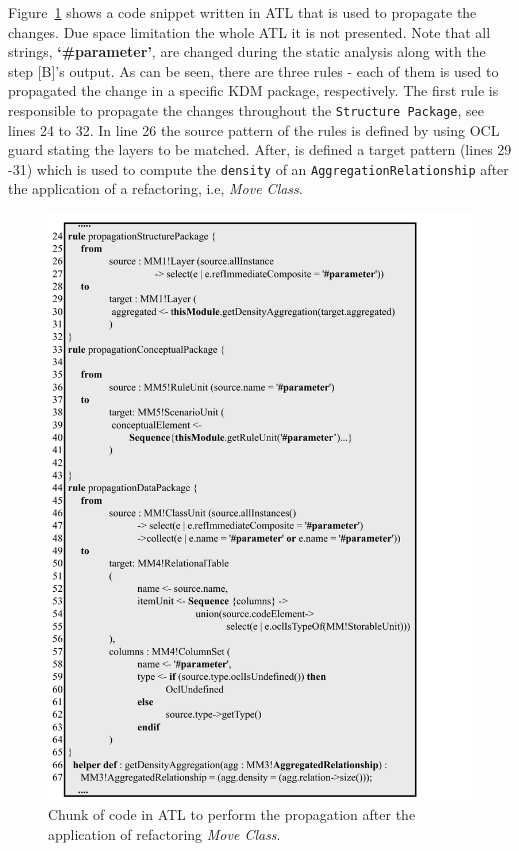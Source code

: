 Figure~\ref{fig:ATLPropagation} shows a code snippet written in ATL that is used to propagate the changes. Due space limitation the whole ATL it is not presented. Note that all strings, \textbf{`\#parameter'}, are changed during the static analysis along with the step [B]'s output. As can be seen, there are three rules - each of them is used to propagated the change in a specific KDM package, respectively. The first rule is responsible to propagate the changes throughout the \texttt{Structure Package}, see lines 24 to 32. In line 26 the source pattern of the rules is defined by using OCL guard stating the layers to be matched. After, is defined a target pattern (lines 29 -31) which is used to compute the \texttt{density} of an \texttt{AggregationRelationship} after the application of a refactoring, i.e, \textit{Move Class}.

\begin{figure}[h]	
	\centering
	\includegraphics[scale=0.516]{figuras/ATLPRopagationSBESFormatted}
	\caption{Chunk of code in ATL to perform the propagation after the application of refactoring \textit{Move Class}.}
	\label{fig:ATLPropagation}
\end{figure}


